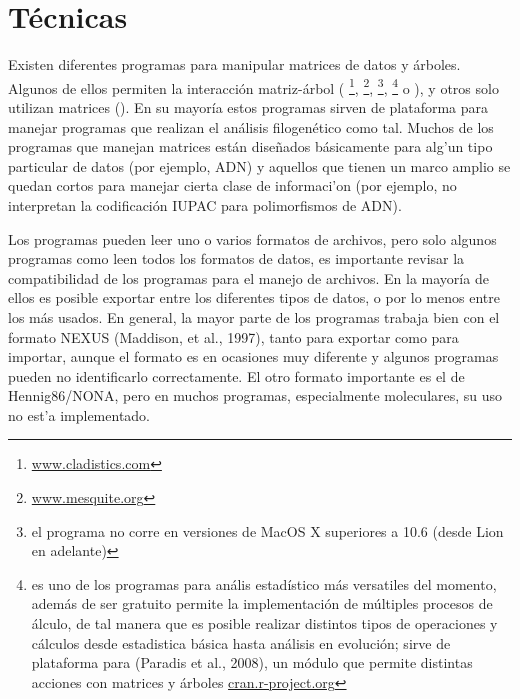 \section*{T\'ecnicas}

Existen diferentes programas para manipular matrices de datos y \'arboles. Algunos de ellos permiten la interacci\'on matriz-\'arbol (
\footnote{\url{www.cladistics.com}}, 
\footnote{\url{www.mesquite.org}}, 
\footnote{el programa no corre en versiones de MacOS X superiores a 10.6 (desde Lion en adelante)}, 
\footnote{
 es uno de los programas para an\'alis estad\'istico m\'as versatiles del momento, adem\'as de ser gratuito permite la implementaci\'on de m\'ultiples procesos de \'alculo, de tal manera que es posible realizar distintos tipos de operaciones y c\'alculos desde estadistica b\'asica hasta an\'alisis en evoluci\'on; sirve de plataforma para  %
(Paradis et al., 2008), un m\'odulo que permite distintas acciones con matrices y \'arboles 
\url{cran.r-project.org}}  o 
), 
y otros solo utilizan matrices (). En su mayor\'ia estos programas sirven de plataforma para manejar programas que realizan el an\'alisis filogen\'etico como tal. Muchos de los programas que manejan matrices est\'an dise\~nados b\'asicamente para alg'un tipo particular de datos (por ejemplo, ADN) y aquellos que tienen un marco amplio se quedan cortos para manejar cierta clase de informaci'on (por ejemplo, no interpretan la codificaci\'on IUPAC para polimorfismos de ADN).

Los programas pueden leer uno o varios formatos de archivos, pero solo algunos programas como  leen todos los formatos de datos, es importante revisar la compatibilidad de los programas para el manejo de archivos. En la mayor\'ia de ellos es posible exportar entre los diferentes tipos de datos, o por lo menos entre los m\'as usados. En general, la mayor parte de los programas trabaja bien con el formato NEXUS (Maddison, et al., 1997), 
tanto para exportar como para importar, aunque el formato es en ocasiones muy diferente y algunos programas pueden no identificarlo correctamente. El otro formato importante es el de Hennig86/NONA, pero en muchos programas, especialmente moleculares, su uso no est'a implementado.

